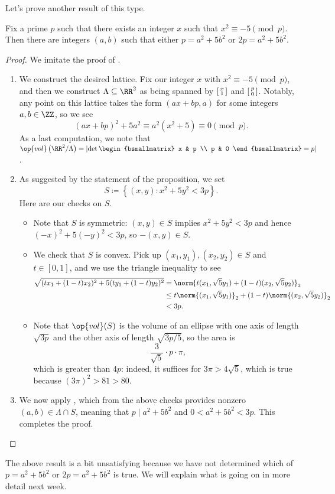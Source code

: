 \documentclass[../notes.tex]{subfiles}
\begin{document}
Let's prove another result of this type.
\begin{proposition}
	Fix a prime $p$ such that there exists an integer $x$ such that $x^2\equiv-5\pmod p$. Then there are integers $(a,b)$ such that either $p=a^2+5b^2$ or $2p=a^2+5b^2$.
\end{proposition}
\begin{proof}
	We imitate the proof of .
	\begin{enumerate}
		\item We construct the desired lattice. Fix our integer $x$ with $x^2\equiv-5\pmod p$, and then we construct $\Lambda\subseteq\RR^2$ as being spanned by $\begin{bsmallmatrix}
			x \\ 1
		\end{bsmallmatrix}$ and $\begin{bsmallmatrix}
			p \\ 0
		\end{bsmallmatrix}$. Notably, any point on this lattice takes the form $(ax+bp,a)$ for some integers $a,b\in\ZZ$, so we see
		\[(ax+bp)^2+5a^2\equiv a^2\left(x^2+5\right)\equiv0\pmod p.\]
		As a last computation, we note that $\op{vol}\left(\RR^2/\Lambda\right)=\left|\det\begin{bsmallmatrix}
			x & p \\
			p & 0
		\end{bsmallmatrix}=p\right|$.
		\item As suggested by the statement of the proposition, we set
		\[S\coloneqq\left\{(x,y):x^2+5y^2<3p\right\}.\]
		Here are our checks on $S$.
		\begin{itemize}
			\item Note that $S$ is symmetric: $(x,y)\in S$ implies $x^2+5y^2<3p$ and hence $(-x)^2+5(-y)^2<3p$, so $-(x,y)\in S$.
			\item We check that $S$ is convex. Pick up $(x_1,y_1),(x_2,y_2)\in S$ and $t\in[0,1]$, and we use the triangle inequality to see
			\begin{align*}
				\sqrt{(tx_1+(1-t)x_2)^2+5(ty_1+(1-t)y_2)^2} &= \norm{t(x_1,\sqrt 5y_1)+(1-t)(x_2,\sqrt5y_2)}_2 \\
				&\le t\norm{(x_1,\sqrt5y_1)}_2+(1-t)\norm{(x_2,\sqrt5y_2)}_2 \\
				&< 3p.
			\end{align*}
			\item Note that $\op{vol}(S)$ is the volume of an ellipse with one axis of length $\sqrt{3p}$ and the other axis of length $\sqrt{3p/5}$, so the area is
			\[\frac3{\sqrt5}\cdot p\cdot\pi,\]
			which is greater than $4p$: indeed, it suffices for $3\pi>4\sqrt5$, which is true because $(3\pi)^2>81>80$.
		\end{itemize}
		\item We now apply , which from the above checks provides nonzero $(a,b)\in\Lambda\cap S$, meaning that $p\mid a^2+5b^2$ and $0<a^2+5b^2<3p$. This completes the proof.
		\qedhere
	\end{enumerate}
\end{proof}
The above result is a bit unsatisfying because we have not determined which of $p=a^2+5b^2$ or $2p=a^2+5b^2$ is true. We will explain what is going on in more detail next week.
\end{document}
